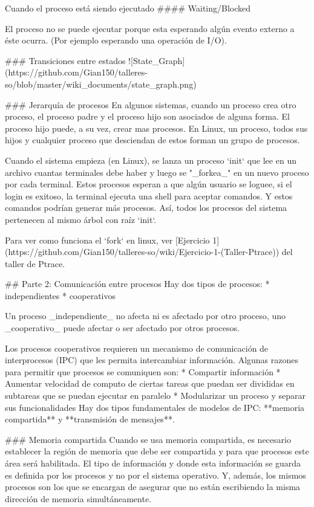 Cuando el proceso está siendo ejecutado
#### Waiting/Blocked

El proceso no se puede ejecutar porque esta esperando algún evento externo a éste ocurra. (Por ejemplo esperando una operación de I/O).

### Transiciones entre estados
![State_Graph](https://github.com/Gian150/talleres-so/blob/master/wiki_documents/state_graph.png)

### Jerarquía de procesos
En algunos sistemas, cuando un proceso crea otro proceso, el proceso padre y el proceso hijo son asociados de alguna forma. El proceso hijo puede, a su vez, crear mas procesos. En Linux, un proceso, todos sus hijos y cualquier proceso que desciendan de estos forman un grupo de procesos.

Cuando el sistema empieza (en Linux), se lanza un proceso `init` que lee en un archivo cuantas terminales debe haber y luego se "_forkea_" en un nuevo proceso por cada terminal. Estos procesos esperan a que algún usuario se loguee, si el login es exitoso, la terminal ejecuta una shell para aceptar comandos. Y estos comandos podrían generar más procesos. Así, todos los procesos del sistema pertenecen al mismo árbol con raíz `init`.

Para ver como funciona el `fork` en linux, ver [Ejercicio 1](https://github.com/Gian150/talleres-so/wiki/Ejercicio-1-(Taller-Ptrace)) del taller de Ptrace.

## Parte 2: Comunicación entre procesos
Hay dos tipos de procesos: 
* independientes
* cooperativos

Un proceso _independiente_ no afecta ni es afectado por otro proceso, uno _cooperativo_ puede afectar o ser afectado por otros procesos.

Los procesos cooperativos requieren un mecanismo de comunicación de interprocesos (IPC) que les permita intercambiar información. Algunas razones para permitir que procesos se comuniquen son:
* Compartir información
* Aumentar velocidad de computo de ciertas tareas que puedan ser divididas en subtareas que se puedan ejecutar en paralelo
* Modularizar un proceso y separar sus funcionalidades
Hay dos tipos fundamentales de modelos de IPC: **memoria compartida** y **transmisión de mensajes**.

### Memoria compartida
Cuando se usa memoria compartida, es necesario establecer la región de memoria que debe ser compartida y para que procesos este área será habilitada. El tipo de información y donde esta información se guarda es definida por los procesos y no por el sistema operativo. Y, además, los mismos procesos son los que se encargan de asegurar que no están escribiendo la misma dirección de memoria simultáneamente.


